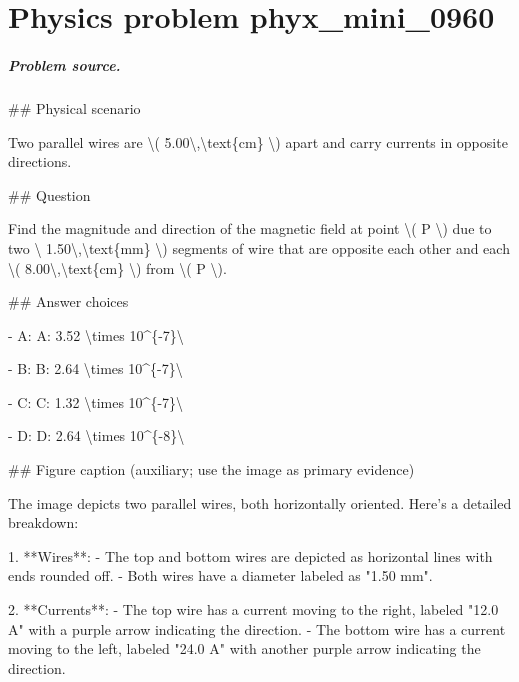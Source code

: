 
\chapter{Physics problem phyx\_mini\_0960}
\label{ch:PhyXMiniProblems_problem_phyx_mini_0960}

\paragraph{Problem source.}
\#\# Physical scenario

Two parallel wires are \textbackslash{}( 5.00\textbackslash{},\textbackslash{}text\{cm\} \textbackslash{}) apart and carry currents in opposite directions.

\#\# Question

Find the magnitude and direction of the magnetic field at point \textbackslash{}( P \textbackslash{}) due to two \textbackslash{} 1.50\textbackslash{},\textbackslash{}text\{mm\} \textbackslash{}) segments of wire that are opposite each other and each \textbackslash{}( 8.00\textbackslash{},\textbackslash{}text\{cm\} \textbackslash{}) from \textbackslash{}( P \textbackslash{}).

\#\# Answer choices

- A: A: 3.52 \textbackslash{}times 10\textasciicircum{}\{-7\}\textbackslash{}

- B: B: 2.64 \textbackslash{}times 10\textasciicircum{}\{-7\}\textbackslash{}

- C: C: 1.32 \textbackslash{}times 10\textasciicircum{}\{-7\}\textbackslash{}

- D: D: 2.64 \textbackslash{}times 10\textasciicircum{}\{-8\}\textbackslash{}

\#\# Figure caption (auxiliary; use the image as primary evidence)

The image depicts two parallel wires, both horizontally oriented. Here's a detailed breakdown:

1. **Wires**:
   - The top and bottom wires are depicted as horizontal lines with ends rounded off.
   - Both wires have a diameter labeled as "1.50 mm".

2. **Currents**:
   - The top wire has a current moving to the right, labeled "12.0 A" with a purple arrow indicating the direction.
   - The bottom wire has a current moving to the left, labeled "24.0 A" with another purple arrow indicating the direction.

